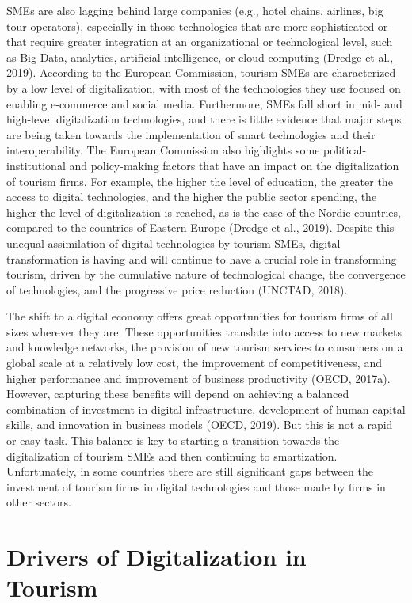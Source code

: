 \documentclass[
  letterpaper,
  DIV=11,
  numbers=noendperiod]{scrreprt}
\begin{document}
SMEs are also lagging behind large companies (e.g., hotel chains,
airlines, big tour operators), especially in those technologies that are
more sophisticated or that require greater integration at an
organizational or technological level, such as Big Data, analytics,
artificial intelligence, or cloud computing (Dredge et al., 2019).
According to the European Commission, tourism SMEs are characterized by
a low level of digitalization, with most of the technologies they use
focused on enabling e-commerce and social media. Furthermore, SMEs fall
short in mid- and high-level digitalization technologies, and there is
little evidence that major steps are being taken towards the
implementation of smart technologies and their interoperability. The
European Commission also highlights some political-institutional and
policy-making factors that have an impact on the digitalization of
tourism firms. For example, the higher the level of education, the
greater the access to digital technologies, and the higher the public
sector spending, the higher the level of digitalization is reached, as
is the case of the Nordic countries, compared to the countries of
Eastern Europe (Dredge et al., 2019). Despite this unequal assimilation
of digital technologies by tourism SMEs, digital transformation is
having and will continue to have a crucial role in transforming tourism,
driven by the cumulative nature of technological change, the convergence
of technologies, and the progressive price reduction (UNCTAD, 2018).

The shift to a digital economy offers great opportunities for tourism
firms of all sizes wherever they are. These opportunities translate into
access to new markets and knowledge networks, the provision of new
tourism services to consumers on a global scale at a relatively low
cost, the improvement of competitiveness, and higher performance and
improvement of business productivity (OECD, 2017a). However, capturing
these benefits will depend on achieving a balanced combination of
investment in digital infrastructure, development of human capital
skills, and innovation in business models (OECD, 2019). But this is not
a rapid or easy task. This balance is key to starting a transition
towards the digitalization of tourism SMEs and then continuing to
smartization. Unfortunately, in some countries there are still
significant gaps between the investment of tourism firms in digital
technologies and those made by firms in other sectors.

\hypertarget{drivers-of-digitalization-in-tourism}{%
\section{Drivers of Digitalization in
Tourism}\label{drivers-of-digitalization-in-tourism}}
\end{document}
